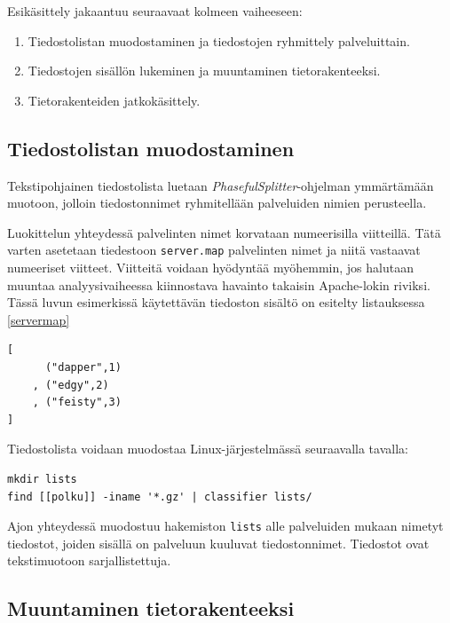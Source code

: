 Esikäsittely jakaantuu seuraavaat kolmeen vaiheeseen:

\begin{enumerate}
\item Tiedostolistan muodostaminen ja tiedostojen ryhmittely palveluittain.
\item Tiedostojen sisällön lukeminen ja muuntaminen tietorakenteeksi.
\item Tietorakenteiden jatkokäsittely.
\end{enumerate}

\subsection{Tiedostolistan muodostaminen}

Tekstipohjainen tiedostolista luetaan
\textit{PhasefulSplitter}-ohjelman ymmärtämään muotoon, jolloin
tiedostonnimet ryhmitellään palveluiden nimien perusteella. 

Luokittelun yhteydessä palvelinten nimet korvataan numeerisilla
viitteillä. Tätä varten asetetaan tiedestoon \texttt{server.map}
palvelinten nimet ja niitä vastaavat numeeriset viitteet. Viitteitä
voidaan hyödyntää myöhemmin, jos halutaan muuntaa analyysivaiheessa
kiinnostava havainto takaisin Apache-lokin riviksi. Tässä luvun
esimerkissä käytettävän tiedoston sisältö on esitelty listauksessa
\ref{servermap}

\begin{lstlisting}[language=MyHaskell,float=h,caption=Tiedoston server.map sisältö.,label=servermap,aboveskip=1cm]
[
      ("dapper",1)
    , ("edgy",2)
    , ("feisty",3)
]
\end{lstlisting}

Tiedostolista voidaan muodostaa
Linux-järjestelmässä seuraavalla tavalla:

\begin{lstlisting}[language=bashshell]
mkdir lists
find [[polku]] -iname '*.gz' | classifier lists/
\end{lstlisting} 

Ajon yhteydessä muodostuu hakemiston \texttt{lists} alle palveluiden
mukaan nimetyt tiedostot, joiden sisällä on palveluun kuuluvat
tiedostonnimet. Tiedostot ovat tekstimuotoon sarjallistettuja.

\subsection{Muuntaminen tietorakenteeksi}


